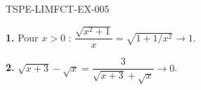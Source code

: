 \begin{corrige}{TSPE-LIMFCT-EX-005}

\textbf{1.} Pour $x > 0$ : $\dfrac{\sqrt{x^2+1}}{x} = \sqrt{1+1/x^2} \to \boxed{1}$.


\textbf{2.} $\sqrt{x+3}-\sqrt{x} = \dfrac{3}{\sqrt{x+3}+\sqrt{x}} \to \boxed{0}$.

\end{corrige}
